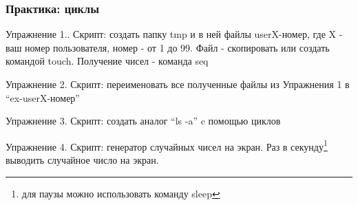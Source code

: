 \begin{frame}
  \frametitle{Практика: циклы}

    \alert{Упражнение 1.}. Скрипт: создать папку tmp и в ней файлы userX-номер, где X - ваш номер пользователя, номер - от 1 до 99. Файл - скопировать или создать командой touch. Получение чисел - команда seq \pause

    \alert{Упражнение 2.} Скрипт: переименовать все полученные файлы из Упражнения 1 в ``ex-userX-номер'' \pause

    \alert{Упражнение 3.} Скрипт: создать аналог ``ls -a'' c помощью циклов \pause

    \alert{Упражнение 4.} Скрипт: генератор случайных чисел на экран. Раз в секунду\footnote{для паузы можно использовать команду sleep} выводить случайное число на экран.
\end{frame}



